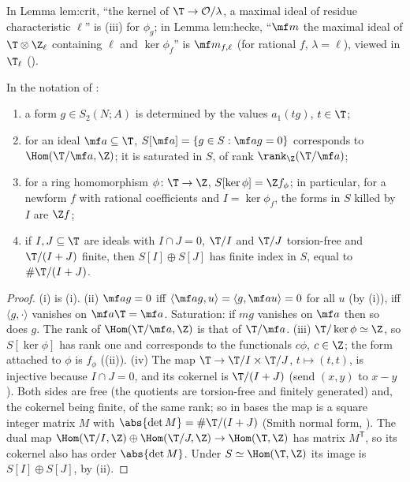 \begin{paperlink}\label{pl:hecke:max-ideal}
In Lemma lem:crit, ``the kernel of $\T\to\mathcal O/\lambda$, a maximal ideal of residue characteristic $\ell$'' is (iii) for $\phi_g$; in Lemma lem:hecke,
``$\mf m$ the maximal ideal of $\T\otimes\Z_\ell$ containing $\ell$ and $\ker\phi_f$'' is $\mf m_{f,\ell}$ (for rational $f$, $\lambda=\ell$), viewed in $\T_\ell$ ().
\end{paperlink}

\begin{corollary}\label{cor:hecke:pairing-consequences}
In the notation of :
\begin{enumerate}[label=(\roman*)]
\item a form $g\in S_2(N;A)$ is determined by the values $a_1(tg)$, $t\in\T$;
\item for an ideal $\mf a\subseteq\T$, $S[\mf a]=\{g\in S:\mf ag=0\}$ corresponds to $\Hom(\T/\mf a,\Z)$; it is saturated in $S$, of rank $\rank_\Z(\T/\mf a)$;
\item for a ring homomorphism $\phi\colon\T\to\Z$, $S[\ker\phi]=\Z f_\phi$; in particular, for a newform $f$ with rational coefficients and $I=\ker\phi_f$, the forms in $S$ killed by $I$ are
$\Z f$;
\item if $I,J\subseteq\T$ are ideals with $I\cap J=0$, $\T/I$ and $\T/J$ torsion-free and $\T/(I+J)$ finite, then $S[I]\oplus S[J]$ has finite index in $S$, equal to $\#\T/(I+J)$.
\end{enumerate}
\end{corollary}

\begin{proof}
(i) is (i). (ii) $\mf ag=0$ iff $\langle\mf ag,u\rangle=\langle g,\mf au\rangle=0$ for all $u$ (by (i)), iff $\langle g,\cdot\rangle$ vanishes on $\mf a\T=\mf a$. Saturation: if
$mg$ vanishes on $\mf a$ then so does $g$. The rank of $\Hom(\T/\mf a,\Z)$ is that of $\T/\mf a$. (iii) $\T/\ker\phi\simeq\Z$, so $S[\ker\phi]$ has rank one and corresponds to the functionals
$c\phi$, $c\in\Z$; the form attached to $\phi$ is $f_\phi$ ((ii)). (iv) The map $\T\to\T/I\times\T/J$, $t\mapsto(t,t)$, is injective because $I\cap J=0$,
and its cokernel is $\T/(I+J)$ (send $(x,y)$ to $x-y$). Both sides are free (the quotients are torsion-free and finitely generated) and, the cokernel being finite, of the same
rank; so in bases the map is a square integer matrix $M$ with $\abs{\det M}=\#\T/(I+J)$ (Smith normal form, ). The dual map $\Hom(\T/I,\Z)\oplus\Hom(\T/J,\Z)\to\Hom(\T,\Z)$
has matrix $M^{\mathsf T}$, so its cokernel also has order $\abs{\det M}$. Under $S\simeq\Hom(\T,\Z)$ its image is $S[I]\oplus S[J]$, by (ii).
\end{proof}

